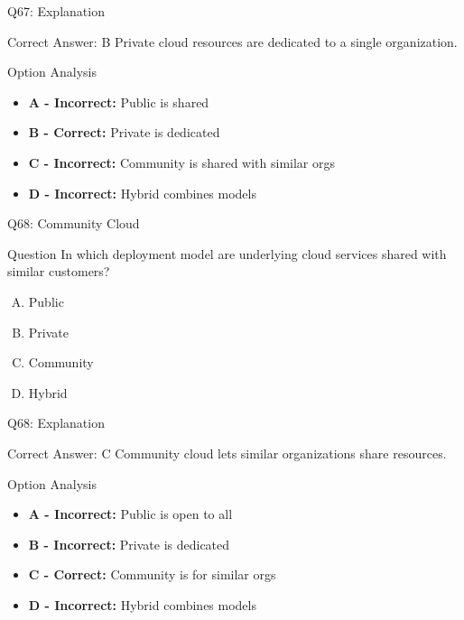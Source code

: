 \documentclass{beamer}
\begin{document}
	\begin{frame}{Q67: Explanation}
		\begin{block}{Correct Answer: B}
			Private cloud resources are dedicated to a single organization.
		\end{block}
		\begin{block}{Option Analysis}
			\begin{itemize}
				\item \textbf{A - Incorrect:} Public is shared
				\item \textbf{B - Correct:} Private is dedicated
				\item \textbf{C - Incorrect:} Community is shared with similar orgs
				\item \textbf{D - Incorrect:} Hybrid combines models
			\end{itemize}
		\end{block}
	\end{frame}
	
	\begin{frame}{Q68: Community Cloud}
		\begin{block}{Question}
			In which deployment model are underlying cloud services shared with similar customers?
		\end{block}
		\begin{enumerate}[(A)]
			\item Public
			\item Private
			\item Community
			\item Hybrid
		\end{enumerate}
	\end{frame}
	
	\begin{frame}{Q68: Explanation}
		\begin{block}{Correct Answer: C}
			Community cloud lets similar organizations share resources.
		\end{block}
		\begin{block}{Option Analysis}
			\begin{itemize}
				\item \textbf{A - Incorrect:} Public is open to all
				\item \textbf{B - Incorrect:} Private is dedicated
				\item \textbf{C - Correct:} Community is for similar orgs
				\item \textbf{D - Incorrect:} Hybrid combines models
			\end{itemize}
		\end{block}
	\end{frame}
	
\end{document}

